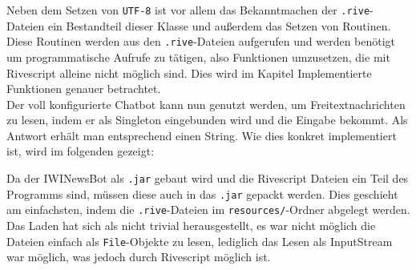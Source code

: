 Neben dem Setzen von \texttt{UTF-8} ist vor allem das Bekanntmachen der \texttt{.rive}-Dateien ein Bestandteil dieser Klasse und außerdem das Setzen von Routinen. Diese Routinen werden aus den \texttt{.rive}-Dateien aufgerufen und werden benötigt um programmatische Aufrufe zu tätigen, also Funktionen umzusetzen, die mit Rivescript alleine nicht möglich sind. Dies wird im Kapitel Implementierte Funktionen genauer betrachtet. \\
Der voll konfigurierte Chatbot kann nun genutzt werden, um Freitextnachrichten zu lesen, indem er als Singleton eingebunden wird und die Eingabe bekommt. Als Antwort erhält man entsprechend einen String. Wie dies konkret implementiert ist, wird im folgenden gezeigt:


Da der IWINewsBot als \texttt{.jar} gebaut wird und die Rivescript Dateien ein Teil des Programms sind, müssen diese auch in das \texttt{.jar} gepackt werden. Dies geschieht am einfachsten, indem die \texttt{.rive}-Dateien im \texttt{resources/}-Ordner abgelegt werden. \\
Das Laden hat sich als nicht trivial herausgestellt, es war nicht möglich die Dateien einfach als \texttt{File}-Objekte zu lesen, lediglich das Lesen als InputStream war möglich, was jedoch durch Rivescript möglich ist.
